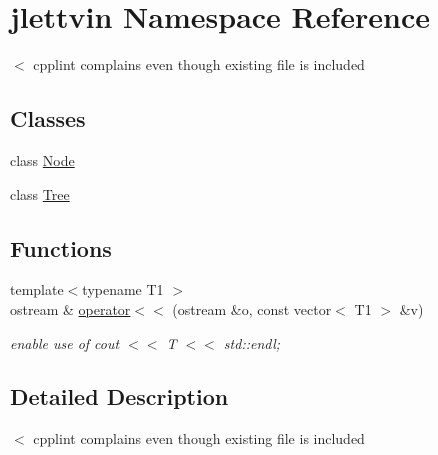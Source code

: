 \hypertarget{namespacejlettvin}{}\section{jlettvin Namespace Reference}
\label{namespacejlettvin}


$<$ cpplint complains even though existing file is included  


\subsection*{Classes}
\begin{DoxyCompactItemize}
\item 
class \hyperlink{classjlettvin_1_1_node}{Node}
\item 
class \hyperlink{classjlettvin_1_1_tree}{Tree}
\end{DoxyCompactItemize}
\subsection*{Functions}
\begin{DoxyCompactItemize}
\item 
\hypertarget{namespacejlettvin_a240221b0ca26041fcbd1bd192beda4bb}{}{\footnotesize template$<$typename T1 $>$ }\\ostream \& \hyperlink{namespacejlettvin_a240221b0ca26041fcbd1bd192beda4bb}{operator$<$$<$} (ostream \&o, const vector$<$ T1 $>$ \&v)\label{namespacejlettvin_a240221b0ca26041fcbd1bd192beda4bb}

\begin{DoxyCompactList}\small\item\em enable use of cout $<$$<$ T $<$$<$ std\+::endl; \end{DoxyCompactList}\end{DoxyCompactItemize}


\subsection{Detailed Description}
$<$ cpplint complains even though existing file is included 